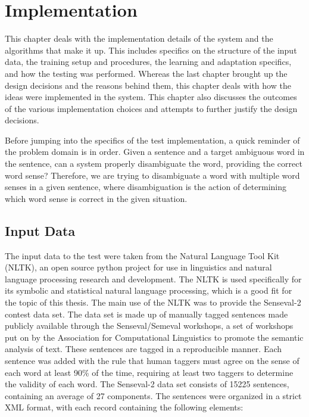 \chapter{Implementation}

This chapter deals with the implementation details of the system and the
algorithms that make it up. This includes specifics on the structure of the
input data, the training setup and procedures, the learning and adaptation
specifics, and how the testing was performed. Whereas the last chapter brought
up the design decisions and the reasons behind them, this chapter deals with how
the ideas were implemented in the system. This chapter also discusses the outcomes of
the various implementation choices and attempts to further justify the design
decisions.

Before jumping into the specifics of the test implementation, a quick reminder
of the problem domain is in order.  Given a sentence and a target ambiguous word in
the sentence, can a system properly disambiguate the word, providing the correct
word sense?  Therefore, we are trying to disambiguate a word with multiple word
senses in a given sentence, where disambiguation is the action of determining
which word sense is correct in the given situation.

\section{Input Data} 

The input data to the test were taken from the Natural
Language Tool Kit (NLTK), an open source python project for use in linguistics
and natural language processing research and development.  The NLTK is used
specifically for its symbolic and statistical natural language processing, which
is a good fit for the topic of this thesis.  The main use of the NLTK was to
provide the Senseval-2 contest data set. The data set is made up of manually
tagged sentences made publicly available through the Senseval/Semeval workshops,
a set of workshops put on by the Association for Computational Linguistics to
promote the semantic analysis of text. These sentences are tagged in a
reproducible manner. Each sentence was added with the rule that human taggers
must agree on the sense of each word at least 90\% of the time, requiring at
least two taggers to determine the validity of each word.  The Senseval-2
data set consists of 15225 sentences, containing an average of 27 components.  The
sentences were organized in a strict XML format, with each record containing the
following elements:

